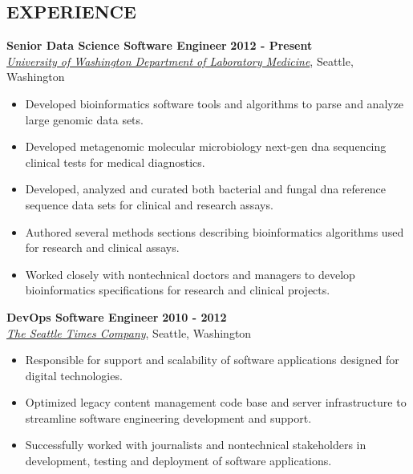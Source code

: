 \documentclass{res}
\begin{document}

\address{Seattle, WA}
\address{crosenth@gmail.com}

\begin{resume}

\section{EXPERIENCE}

\textbf{Senior Data Science Software Engineer} \hfill \textbf{2012 - Present}\\
\href{http://depts.washington.edu/labweb/}{\textit{University of Washington Department of Laboratory Medicine}}, 
Seattle, Washington
\begin{itemize} \itemsep -2pt
\item Developed bioinformatics software tools and algorithms to parse and analyze large genomic data sets.
\item Developed metagenomic molecular microbiology next-gen dna sequencing clinical tests for medical diagnostics.
\item Developed, analyzed and curated both bacterial and fungal dna reference sequence data sets for clinical and research assays.
\item Authored several methods sections describing bioinformatics algorithms used for research and clinical assays.
\item Worked closely with nontechnical doctors and managers to develop bioinformatics specifications for research and clinical projects.
\end{itemize}

\textbf{DevOps Software Engineer} \hfill \textbf{2010 - 2012}\\
\href{http://www.seattletimes.com/}{\textit{The Seattle Times Company}}, Seattle, Washington
\begin{itemize} \itemsep -2pt
\item Responsible for support and scalability of software applications designed for digital technologies.
\item Optimized legacy content management code base and server infrastructure to streamline software engineering development and support.
\item Successfully worked with journalists and nontechnical stakeholders in development, testing and deployment of software applications.
\end{itemize}


\end{resume}
\end{document}
